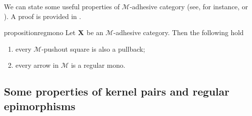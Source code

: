 \documentclass[a4paper,UKenglish,cleveref,pdftex,thm-restate,numberwithinsect]{lipics-v2021}
\def\C{\textbf {\textup{C}}}
\def\X{\textbf {\textup{X}}}
\begin{document}
\iffalse 
\begin{remark}\label{rem:deco}
We can point out an important property of strict $\mathcal{M}$-adhesive categories with pullbacks.  Consider the solid part of the cube aside, whose bottom case is an $\mathcal{M}$-pushout.
	
	\parbox{9.5cm}{	Given an arrow $d\colon X\to D$, we can present the object $X$ has a pushout: indeed, consider the following cube, in which all the three vertical squares are pullbacks.}
	\parbox{3cm}{
	\xymatrix@C=15pt@R=9pt{&V\ar[dd]|\hole_(.65){a}\ar[rr]^{v} \ar@{>.>}[dl]_{u} && Y \ar[dd]^{b} \ar@{>->}[dl]_{y} \\ Z  \ar[dd]_{c}\ar[rr]^(.7){z} & & X \ar[dd]_(.3){d}\\&A\ar[rr]|\hole^(.65){f} \ar@{>->}[dl]^{m} && B \ar@{>->}[dl]^{n} \\C \ar[rr]_{g} & & D }}

Now, notice that, since the front square is a pullback, then the dotted arrow $u\colon V\to Z$ exists. Moreover, the usual composition and decomposition property of pullbacks \cite{mac2013categories} entails that the left face of the cube so obtained is a pullback too, proving that $u$ is in $\mathcal{M}$ and that the top square is a pushout.

	Clearly if the arrow $p\colon X\to D$ is in $\mathcal{M}$, we can omit the assumptions of strictness and the existence of all pullbacks.
\end{remark}
\fi 


We can state some useful properties of $\mathcal{M}$-adhesive category
(see, for instance, \cite[Thm.~4.26]{ehrig2006fundamentals} or \cite[Fact 2.6]{azzi2019essence}). A proof is provided in .
\begin{restatable}{proposition}{regmono}\label{prop:regmono}
	Let $\X$ be an $\mathcal{M}$-adhesive category. Then the following hold
	\begin{enumerate}
		\item every $\mathcal{M}$-pushout square is also a pullback;
		\item every arrow in $\mathcal{M}$ is a regular mono.
	\end{enumerate}
\end{restatable}


\subsection{Some properties of kernel pairs and regular epimorphisms}
\end{document}

